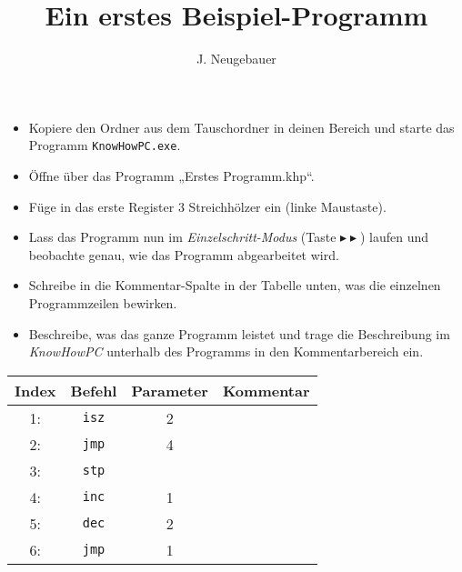 \documentclass[10pt, a4paper]{scrartcl}
\author{J. Neugebauer}
\title{Ein erstes Beispiel-Programm}
\date{\Heute}
\begin{document}
\ReiheTitel

\begin{aufgabe}[symbol=\symLaptop]
	\begin{itemize}
		\item Kopiere den Ordner  aus dem Tauschordner in deinen Bereich und starte das Programm \texttt{KnowHowPC.exe}.
		\item Öffne über  das Programm „Erstes Programm.khp“.
		\item Füge in das erste Register 3 Streichhölzer ein (linke Maustaste).
		\item Lass das Programm nun im \emph{Einzelschritt-Modus} (Taste $\blacktriangleright\blacktriangleright$) laufen und beobachte genau, wie das Programm abgearbeitet wird.
	\end{itemize}
	
	\medskip
	\begin{itemize}
		\item Schreibe in die Kommentar-Spalte in der Tabelle unten, was die einzelnen Programmzeilen bewirken.
		\item Beschreibe, was das ganze Programm leistet und trage die Beschreibung im \emph{KnowHowPC} unterhalb des Programms in den Kommentarbereich ein.
	\end{itemize}
	
	\begin{center}
	\begin{tabularx}{.8\textwidth}{|c|c|c|X|}\hline
		\rowcolor{black!10}
		Index & Befehl & Parameter & Kommentar \\\hline
		1: & \texttt{isz} & 2 & \Zeilenabstand\\\hline
		2: & \texttt{jmp} & 4 & \Zeilenabstand\\\hline
		3: & \texttt{stp} &   & \Zeilenabstand\\\hline
		4: & \texttt{inc} & 1 & \Zeilenabstand\\\hline
		5: & \texttt{dec} & 2 & \Zeilenabstand\\\hline
		6: & \texttt{jmp} & 1 & \Zeilenabstand\\\hline
	\end{tabularx}
	\end{center}
\end{aufgabe}
\end{document}
